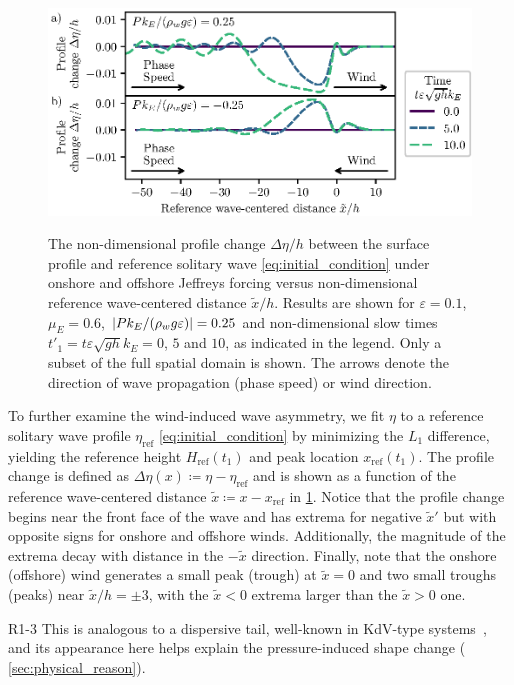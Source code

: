 \documentclass{jfm}
\renewcommand*{\epsilon}{\varepsilon}
\begin{document}
\begin{figure}
  \centering
  { %
    \label{fig:snapshots_solitary_tail:a}
    \label{fig:snapshots_solitary_tail:b}
  }
  \includegraphics{Snapshots-Positive-Negative-Tail.eps}
  \caption{
    The non-dimensional profile change $\Delta \eta/h$ between the
    surface profile and reference solitary wave
    \cref{eq:initial_condition} under
     onshore and
     offshore Jeffreys forcing
    versus non-dimensional reference wave-centered distance
    $\tilde{x}/h$.
    Results are shown for $\epsilon=0.1$, $\mu_E = 0.6$, $\abs{P
    k_E/(\rho_w g \epsilon)} = 0.25$ and non-dimensional slow times
    $t'_1 = t \epsilon \sqrt{gh} k_E = 0$, $5$ and $10$, as indicated
    in the legend.
    Only a subset of the full spatial domain is shown.
    The arrows denote the direction of wave propagation (phase speed) or
    wind direction.
  }\label{fig:snapshots_solitary_tail}
\end{figure}

To further examine the wind-induced wave asymmetry, we fit $\eta$ to a
reference solitary wave profile $\eta_{\text{ref}}$
\cref{eq:initial_condition} by minimizing the $L_1$ difference, yielding
the reference height $H_{\text{ref}}(t_1)$ and peak location
$x_{\text{ref}}(t_1)$.
The profile change is defined as $\Delta \eta(x) \coloneqq \eta -
\eta_{\text{ref}}$ and is shown as a function of the reference
wave-centered distance $\tilde{x} \coloneqq x - x_{\text{ref}}$ in
\cref{fig:snapshots_solitary_tail}.
Notice that the profile change begins near the front face of the wave
and has extrema for negative $\tilde{x}'$ but with opposite signs for
onshore and offshore winds.
Additionally, the magnitude of the extrema decay with distance in the
$-\tilde{x}$ direction.
Finally, note that the onshore (offshore) wind generates a small peak
(trough) at $\tilde{x} = 0$ and two small troughs (peaks) near
$\tilde{x}/h = \pm 3$, with the $\tilde{x}<0$ extrema larger than the
$\tilde{x}>0$ one.
\begin{LineLabel}{R1-3}
This is analogous to a dispersive tail, well-known in KdV-type
systems~\citep[\eg][]{hammack1974korteweg}, and its appearance here
helps explain the pressure-induced shape change (\cf{}
\cref{sec:physical_reason}).
\end{LineLabel}
\end{document}
